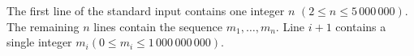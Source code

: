 The first line of the standard input contains one integer $n$ $(2 \le n \le 5\,000\,000)$. The remaining $n$ lines contain
the sequence $m_1, \ldots, m_n$. Line $i + 1$ contains a single integer $m_i (0 \le m_i \le 1\,000\,000\,000)$.
